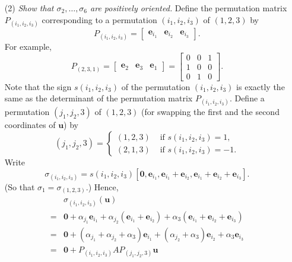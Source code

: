 \documentclass{article}
\begin{document}
\begin{enumerate}
\item[(2)]
  \emph{Show that $\sigma_2, \ldots, \sigma_6$ are positively oriented.}
  Define the permutation matrix $P_{(i_1,i_2,i_3)}$ corresponding to
  a permutation $(i_1,i_2,i_3)$ of $(1,2,3)$ by
  \[
    P_{(i_1,i_2,i_3)}
    =
    \begin{bmatrix}
      \mathbf{e}_{i_1} & \mathbf{e}_{i_2} & \mathbf{e}_{i_3}
    \end{bmatrix}.
  \]
  For example,
  \[
    P_{(2,3,1)}
    =
    \begin{bmatrix}
      \mathbf{e}_{2} & \mathbf{e}_{3} & \mathbf{e}_{1}
    \end{bmatrix}
    =
    \begin{bmatrix}
      0 & 0 & 1 \\
      1 & 0 & 0 \\
      0 & 1 & 0
    \end{bmatrix}.
  \]
  Note that the sign $s(i_1,i_2,i_3)$ of the permutation $(i_1,i_2,i_3)$
  is exactly the same as the determinant of the permutation matrix $P_{(i_1,i_2,i_3)}$.
  Define a permutation $(j_1, j_2, 3)$ of $(1, 2, 3)$
  (for swapping the first and the second coordinates of $\mathbf{u}$)
  by
  \begin{equation*}
    (j_1, j_2, 3) =
      \begin{cases}
        (1, 2, 3) & \text{ if $s(i_1,i_2,i_3) = 1$}, \\
        (2, 1, 3) & \text{ if $s(i_1,i_2,i_3) = -1$}.
      \end{cases}
  \end{equation*}
  Write
  \[
    \sigma_{(i_1, i_2, i_3)}
    =
    s(i_1, i_2, i_3)
    [
      \mathbf{0},
      \mathbf{e}_{i_1},
      \mathbf{e}_{i_1}+\mathbf{e}_{i_2},
      \mathbf{e}_{i_1}+\mathbf{e}_{i_2}+\mathbf{e}_{i_3}
    ].
  \]
  (So that $\sigma_1 = \sigma_{(1,2,3)}$.)
  Hence,
  \begin{align*}
    &
    \sigma_{(i_1, i_2, i_3)}(\mathbf{u}) \\
    =& \mathbf{0}
      + \alpha_{j_1} \mathbf{e}_{i_1}
      + \alpha_{j_2} (\mathbf{e}_{i_1}+\mathbf{e}_{i_2})
      + \alpha_3 (\mathbf{e}_{i_1}+\mathbf{e}_{i_2}+\mathbf{e}_{i_3}) \\
    =& \mathbf{0}
      + (\alpha_{j_1}+\alpha_{j_2}+\alpha_3) \mathbf{e}_{i_1}
      + (\alpha_{j_2}+\alpha_3) \mathbf{e}_{i_2}
      + \alpha_3 \mathbf{e}_{i_3} \\
    =& \mathbf{0} + P_{(i_1,i_2,i_3)} A P_{(j_1,j_2,3)}\mathbf{u}
  \end{align*}

\end{enumerate}
\end{document}
